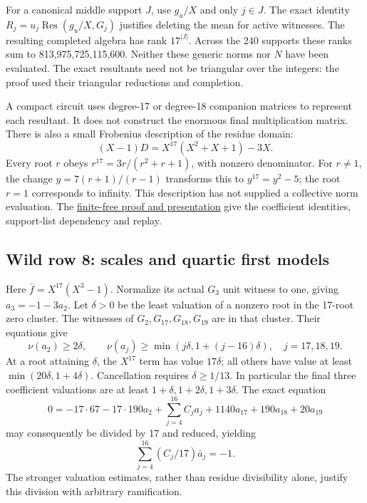 \documentclass[
  british,
  10pt,
]{article}
\begin{document}
For a canonical middle support \(J\), use \(g_u/X\) and only \(j\in J\).
The exact identity \(R_j=u_j\operatorname{Res}(g_u/X,G_j)\) justifies
deleting the mean for active witnesses. The resulting completed algebra
has rank \(17^{|J|}\). Across the 240 supports these ranks sum to
813,975,725,115,600. Neither these generic norms nor \(N\) have been
evaluated. The exact resultants need not be triangular over the
integers: the proof used their triangular reductions and completion.

A compact circuit uses degree-17 or degree-18 companion matrices to
represent each resultant. It does not construct the enormous final
multiplication matrix. There is also a small Frobenius description of
the residue domain: \[
 (X-1)D=X^{17}(X^2+X+1)-3X.
\] Every root \(r\) obeys \(r^{17}=3r/(r^2+r+1)\), with nonzero
denominator. For \(r\ne1\), the change \(y=7(r+1)/(r-1)\) transforms
this to \(y^{17}=y^2-5\); the root \(r=1\) corresponds to infinity. This
description has not supplied a collective norm evaluation. The
\href{evidence/full/collective17/elimination/FINITE_FLAT_REDUCTION.md}{finite-free
proof and presentation} give the coefficient identities, support-list
dependency and replay.

\subsection{Wild row 8: scales and quartic first
models}\label{wild-row-8-scales-and-quartic-first-models}

Here \(\bar f=X^{17}(X^3-1)\). Normalize its actual \(G_3\) unit witness
to one, giving \(a_3=-1-3a_2\). Let \(\delta>0\) be the least valuation
of a nonzero root in the 17-root zero cluster. The witnesses of
\(G_2,G_{17},G_{18},G_{19}\) are in that cluster. Their equations give
\[
 \nu(a_2)\ge2\delta,\qquad
 \nu(a_j)\ge\min(j\delta,1+(j-16)\delta),\quad j=17,18,19.
\] At a root attaining \(\delta\), the \(X^{17}\) term has value
\(17\delta\); all others have value at least
\(\min(20\delta,1+4\delta)\). Cancellation requires \(\delta\ge1/13\).
In particular the final three coefficient valuations are at least
\(1+\delta,1+2\delta,1+3\delta\). The exact equation \[
 0=-17\cdot67-17\cdot190a_2+\sum_{j=4}^{16}C_ja_j
        +1140a_{17}+190a_{18}+20a_{19}
\] may consequently be divided by 17 and reduced, yielding \[
 \sum_{j=4}^{16}(C_j/17)\bar a_j=-1.                       \tag{D9}
\] The stronger valuation estimates, rather than residue divisibility
alone, justify this division with arbitrary ramification.
\end{document}
